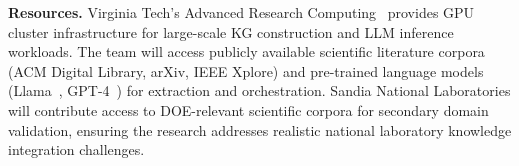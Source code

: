 \documentclass{files/proposalnsf}
\begin{document}
\noindent\textbf{Resources.} Virginia Tech's Advanced Research Computing~\cite{} provides GPU cluster infrastructure for large-scale KG construction and LLM inference workloads. The team will access publicly available scientific literature corpora (\eg ACM Digital Library, arXiv, IEEE Xplore) and pre-trained language models (\eg Llama~\cite{}, GPT-4~\cite{}) for extraction and orchestration. Sandia National Laboratories will contribute access to DOE-relevant scientific corpora for secondary domain validation, ensuring the research addresses realistic national laboratory knowledge integration challenges.



\end{document}

